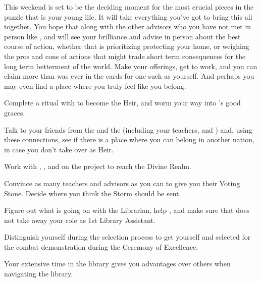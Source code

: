 \documentclass[char]{GL2020}
\begin{document}
This weekend is set to be the deciding moment for the most crucial pieces in the puzzle that is your young life. It will take everything you've got to bring this all together. You hope that \cDiplomat{} along with the other advisors who you have not met in person like \cAntiChup{}, and \cAssistantScientist{} will see your brilliance and advise in person about the best course of action, whether that is prioritizing protecting your home, or weighing the pros and cons of actions that might trade short term consequences for the long term betterment of the world. Make your offerings, get to work, and you can claim more than was ever in the cards for one such as yourself. And perhaps you may even find a place where you truly feel like you belong. 

\begin{itemz}
    \item Complete a ritual with \cHeir{} to become the \cHeir{\formal} Heir, and worm your way into \cDiplomat{}’s good graces.
    \item Talk to your friends from the \pShip{} and the \pFarm{} (including your teachers, \cPrince{} and \cFlowPriest{}) and, using these connections, see if there is a place where you can belong in another nation, in case you don’t take over as \cHeir{\formal} Heir.
    \item Work with \cFlowPriest{}, \cCurse{}, and \cAssistantScientist{} on the project to reach the Divine Realm.
\end{itemz}

\begin{itemz}
    \item Convince as many teachers and advisors as you can to give you their Voting Stone. Decide where you think the Storm should be sent. 
    \item Figure out what is going on with the Librarian, help \cLibrarian{\them}, and make sure that \cLibAssist{} does not take away your role as 1st Library Assistant.
    \item Distinguish yourself during the selection process to get yourself and \cChupStudent{} selected for the combat demonstration during the Ceremony of Excellence.
\end{itemz}

\begin{itemz}[Notes]
    \item Your extensive time in the library gives you advantages over others when navigating the library.
\end{itemz}
\end{document}
